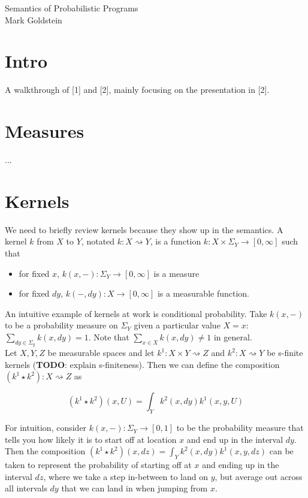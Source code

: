 \documentclass[11pt]{article}
\theoremstyle{definition}
\theoremstyle{plain}
\begin{document}
\begin{center}
Semantics of Probabilistic Programs\\
Mark Goldstein
\end{center}

\section{Intro}

\noindent A walkthrough of [1] and [2], mainly focusing on the presentation 
in [2].

\section{Measures}

\noindent ...

\section{Kernels} 

\noindent We need to briefly review kernels because
they show up in the semantics. A kernel $k$ from $X$ to $Y$, notated
$k: X \rightsquigarrow Y$, is a function $k: X \times \Sigma_Y \rightarrow [0,\infty]$
such that

\begin{itemize}
    \item for fixed $x$, $k(x,-): \Sigma_Y \rightarrow [0,\infty]$ is a measure
    \item for fixed $dy$, $k(-,dy): X \rightarrow [0,\infty]$ is a measurable function.
\end{itemize}

\noindent An intuitive example of kernels at work is conditional probability.
Take $k(x,-)$ to be a probability measure on $\Sigma_Y$ given a particular value $X=x$:
$\sum_{dy \in \Sigma_y} k(x,dy) = 1$. Note that $\sum_{x \in X} k(x,dy) \neq 1$ in general.\\

\noindent Let $X,Y,Z$ be measurable spaces and let
$k^1 : X \times Y \rightsquigarrow Z$ and 
$k^2 : X \rightsquigarrow Y$ be s-finite kernels (\textbf{TODO}: explain s-finiteness). 
Then we can define the composition $(k^1 \star k^2) : X \rightsquigarrow Z$ as

$$ (k^1 \star k^2)(x,U) = \int_Y k^2(x,dy) k^1(x,y,U) $$

\noindent For intuition, consider $k(x,-): \Sigma_Y \rightarrow [0,1]$
to be the probability measure that tells you how likely it is to start
off at location $x$ and end up in the interval $dy$. Then the composition
$(k^1 \star k^2)(x,dz) = \int_Y k^2(x,dy) k^1(x,y,dz)$ can be taken to represent
the probability of starting off at $x$ and ending up in the interval $dz$, where
we take a step in-between to land on $y$, but average out across all intervals
$dy$ that we can land in when jumping from $x$.\\
\end{document}
